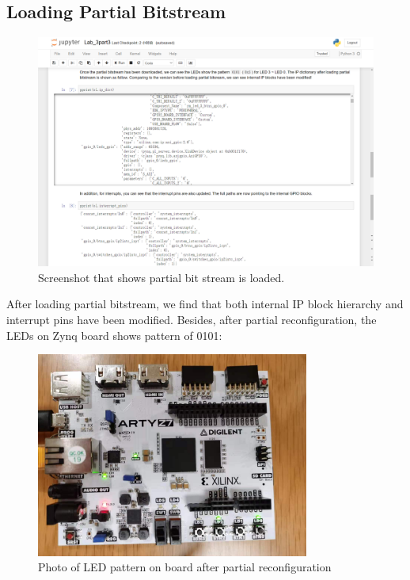 \documentclass[a4paper]{article}
\begin{document}
\subsection{Loading Partial Bitstream}
\begin{figure}[H]
    \centering
    \includegraphics[width=1\textwidth]{2.png}
    \caption{Screenshot that shows partial bit stream is loaded.}
\end{figure}
After loading partial bitstream, we find that both internal IP block hierarchy and interrupt pins have been modified. Besides, after partial reconfiguration, the LEDs on Zynq board shows pattern of 0101:
\begin{figure}[H]
    \centering
    \includegraphics[width=0.8\textwidth]{2-2.jpg}
    \caption{Photo of LED pattern on board after partial reconfiguration}
\end{figure}
\end{document}
